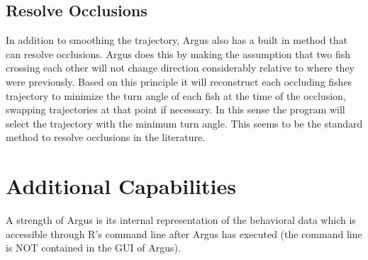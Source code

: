 \documentclass[12pt,titlepage]{report}
\begin{document}
\section{Resolve Occlusions}
In addition to smoothing the trajectory, Argus also has a built in method that can resolve occlusions. Argus does this by making the assumption that two fish crossing each other will not change direction considerably relative to where they were previously. Based on this principle it will reconstruct each occluding fishes trajectory to minimize the turn angle of each fish at the time of the occlusion, swapping trajectories at that point if necessary. In this sense the program will select the trajectory with the minimum turn angle. This seems to be the standard method to resolve occlusions in the literature.

\chapter{Additional Capabilities}
A strength of Argus is its internal representation of the behavioral data which is accessible through R’s command line after Argus has executed (the command line is NOT contained in the GUI of Argus).
\end{document}
